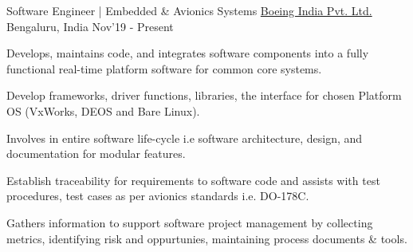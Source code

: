 \begin{cventries}
	\cventry
	{Software Engineer | Embedded \& Avionics Systems}
	{\href{https://www.boeing.co.in/}{Boeing India Pvt. Ltd.}}
	{Bengaluru, India}
	{Nov'19 - Present}
	{
		\begin{cvitems}
		\item{Develops, maintains code, and integrates software components into a fully functional real-time platform software for common core systems.}
		\item{Develop frameworks, driver functions, libraries, the interface for chosen Platform OS (VxWorks, DEOS and Bare Linux).}
		\item{Involves in entire software life-cycle i.e software architecture, design, and documentation for modular features.}
		\item{Establish traceability for requirements to software code and assists with test procedures, test cases as per avionics standards i.e. DO-178C.}
		\item{Gathers information to support software project management by collecting metrics, identifying risk and oppurtunies, maintaining process documents \& tools.}
		\end{cvitems}
	}


\end{cventries}
